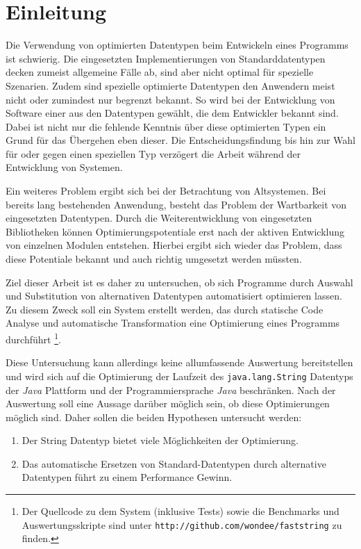 \chapter{Einleitung}
Die Verwendung von optimierten Datentypen beim Entwickeln eines Programms ist schwierig.
Die eingesetzten Implementierungen von Standarddatentypen decken zumeist allgemeine 
Fälle ab, sind aber nicht optimal für spezielle Szenarien. Zudem sind spezielle
optimierte Datentypen den Anwendern meist nicht oder zumindest nur begrenzt bekannt.
So wird bei der Entwicklung von Software einer aus den Datentypen 
gewählt, die dem Entwickler bekannt sind. Dabei ist nicht nur die fehlende 
Kenntnis über diese optimierten Typen ein Grund für das Übergehen eben dieser. Die 
Entscheidungsfindung bis hin zur Wahl für oder gegen einen speziellen
Typ verzögert die Arbeit während der Entwicklung von Systemen. 

Ein weiteres Problem ergibt sich bei der Betrachtung von Altsystemen. Bei bereits 
lang bestehenden Anwendung, besteht das Problem der Wartbarkeit von eingesetzten Datentypen. 
Durch die Weiterentwicklung von eingesetzten Bibliotheken können Optimierungspotentiale
erst nach der aktiven Entwicklung von einzelnen Modulen entstehen. Hierbei ergibt sich
wieder das Problem, dass diese Potentiale bekannt und auch richtig umgesetzt werden müssten.

Ziel dieser Arbeit ist es daher zu untersuchen, ob sich Programme durch Auswahl und 
Substitution von alternativen Datentypen automatisiert optimieren lassen. Zu diesem Zweck
soll ein System erstellt werden, das durch statische Code Analyse und automatische
Transformation eine Optimierung eines Programms durchführt \footnote{Der Quellcode zu 
dem System (inklusive Tests) sowie die Benchmarks und Auswertungsskripte sind unter 
\texttt{http://github.com/wondee/faststring} zu finden.}.

Diese Untersuchung kann allerdings keine allumfassende Auswertung bereitstellen und wird 
sich auf die Optimierung der Laufzeit des \texttt{java.lang.String} Datentyps der 
\textit{Java} Plattform und der Programmiersprache \textit{Java} beschränken. Nach 
der Auswertung soll eine Aussage darüber möglich sein, ob diese Optimierungen möglich sind.
Daher sollen die beiden Hypothesen untersucht werden:
\\
\begin{enumerate}
	\item Der String Datentyp bietet viele Möglichkeiten der Optimierung.
	\item Das automatische Ersetzen von Standard-Datentypen durch alternative Datentypen führt zu einem
	Performance Gewinn.
\end{enumerate}

